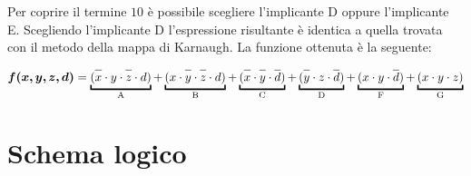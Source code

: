 \documentclass{article}
\newcommand*{\oline}[1]{\overline{#1\mathstrut}}
\begin{document}
Per coprire il termine $10$ è possibile scegliere l'implicante D oppure l'implicante E. Scegliendo l'implicante D l'espressione risultante è identica a quella trovata con il metodo della mappa di Karnaugh.
La funzione ottenuta è la seguente:

\begin{align*}
\bm{f(x,y,z,d)} = \underbracket{(\oline{x} \cdot y \cdot \oline{z} \cdot d)}_{\text{A}} + \underbracket{(x \cdot \oline{y} \cdot \oline{z} \cdot d)}_{\text{B}} + \underbracket{(\oline{x} \cdot \oline{y} \cdot \oline{d})}_{\text{C}} + \underbracket{(\oline{y} \cdot z \cdot \oline{d})}_{\text{D}} + \underbracket{(x \cdot y \cdot \oline{d})}_{\text{F}} + \underbracket{(x \cdot y \cdot z)}_{\text{G}}
\end{align*}
\newpage       
\section{Schema logico}
\bigskip
\end{document}
